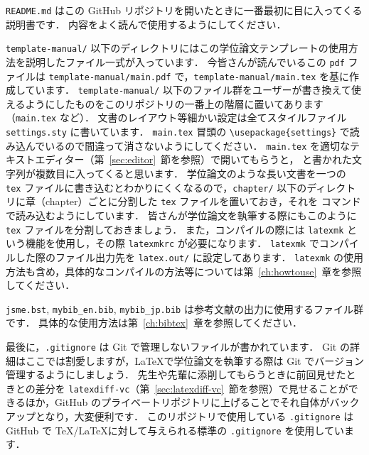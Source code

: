 \verb|README.md| はこの GitHub リポジトリを開いたときに一番最初に目に入ってくる説明書です．
内容をよく読んで使用するようにしてください．

\verb|template-manual/| 以下のディレクトリにはこの学位論文テンプレートの使用方法を説明したファイル一式が入っています．
今皆さんが読んでいるこの \verb|pdf| ファイルは \verb|template-manual/main.pdf| で，\verb|template-manual/main.tex| を基に作成しています．
\verb|template-manual/| 以下のファイル群をユーザーが書き換えて使えるようにしたものをこのリポジトリの一番上の階層に置いてあります（\verb|main.tex| など）．
文書のレイアウト等細かい設定は全てスタイルファイル \verb|settings.sty| に書いています．
\verb|main.tex| 冒頭の \verb|\usepackage{settings}| で読み込んでいるので間違って消さないようにしてください．
\verb|main.tex| を適切なテキストエディター（第~\ref{sec:editor}~節を参照）で開いてもらうと，\verb|| と書かれた文字列が複数目に入ってくると思います．
学位論文のような長い文書を一つの \verb|tex| ファイルに書き込むとわかりにくくなるので，\verb|chapter/| 以下のディレクトリに章（chapter）ごとに分割した \verb|tex| ファイルを置いておき，それを \verb|| コマンドで読み込むようにしています．
皆さんが学位論文を執筆する際にもこのように \verb|tex| ファイルを分割しておきましょう．
また，コンパイルの際には \verb|latexmk| という機能を使用し，その際 \verb|latexmkrc| が必要になります．
\verb|latexmk| でコンパイルした際のファイル出力先を \verb|latex.out/| に設定してあります．
\verb|latexmk| の使用方法も含め，具体的なコンパイルの方法等については第~\ref{ch:howtouse}~章を参照してください．

\verb|jsme.bst|, \verb|mybib_en.bib|, \verb|mybib_jp.bib| は参考文献の出力に使用するファイル群です．
具体的な使用方法は第~\ref{ch:bibtex}~章を参照してください．

最後に，\verb|.gitignore| は Git で管理しないファイルが書かれています．
Git の詳細はここでは割愛しますが，\LaTeX で学位論文を執筆する際は Git でバージョン管理するようにしましょう．
先生や先輩に添削してもらうときに前回見せたときとの差分を \verb|latexdiff-vc|（第~\ref{sec:latexdiff-vc}~節を参照）で見せることができるほか，GitHub のプライベートリポジトリに上げることでそれ自体がバックアップとなり，大変便利です．
このリポジトリで使用している \verb|.gitignore| は GitHub で \TeX/\LaTeX に対して与えられる標準の \verb|.gitignore| を使用しています．


